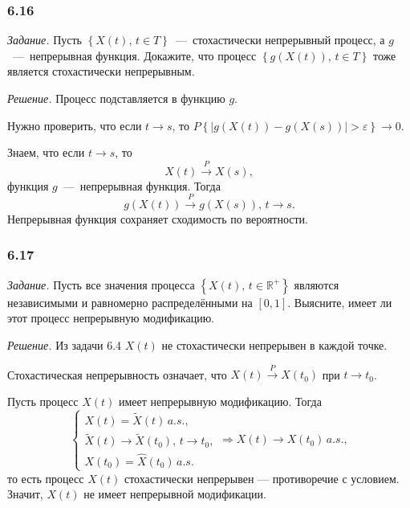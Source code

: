 \subsubsection*{6.16}

\textit{Задание.}
Пусть $ \left\{ X \left( t \right), \, t \in T \right\} $~---~стохастически непрерывный процесс,
а $g$~---~непрерывная функция.
Докажите, что процесс $ \left\{ g \left( X \left( t \right) \right), \, t \in T \right\} $
тоже является стохастически непрерывным.

\textit{Решение.}
Процесс подставляется в функцию $g$.

Нужно проверить, что если $t \to s$, то
$P \left\{
    \left| g \left( X \left( t \right) \right) - g \left( X \left( s \right) \right) \right| >
    \varepsilon \right\}
  \to 0$.

Знаем, что если $t \to s$, то
\begin{equation*}
  X \left( t \right) \overset{P}{ \to }
  X \left( s \right),
\end{equation*}
функция $g$~---~непрерывная функция.
Тогда
\begin{equation*}
  g \left( X \left( t \right) \right) \overset{P}{ \to } g \left( X \left( s \right) \right), \,
  t \to s.
\end{equation*}
Непрерывная функция сохраняет сходимость по вероятности.

\subsubsection*{6.17}

\textit{Задание.}
Пусть все значения процесса $ \left\{ X \left( t \right), \, t \in \mathbb{R}^+ \right\} $
являются независимыми и равномерно распределёнными на $ \left[ 0, 1 \right] $.
Выясните, имеет ли этот процесс непрерывную модификацию.

\textit{Решение.}
Из задачи 6.4 $X \left( t \right) $ не стохастически непрерывен в каждой точке.

Стохастическая непрерывность означает,
что $X \left( t \right) \overset{P}{ \to } X \left( t_0 \right) $ при $t \to t_0$.

Пусть процесс $X \left( t \right) $ имеет непрерывную модификацию.
Тогда
$$ \begin{cases}
    X \left( t \right) = \tilde{X} \left( t \right) \, a.s., \\
    \tilde{X} \left( t \right) \to \tilde{X} \left( t_0 \right), \, t \to t_0, \\
    X \left( t_0 \right) = \hat{X} \left( t_0 \right) \, a.s.
  \end{cases} \Rightarrow X \left( t \right) \to X \left( t_0 \right) \, a.s.,$$
то есть процесс $X \left( t \right) $ стохастически непрерывен --- противоречие с условием.
Значит, $X \left( t \right) $ не имеет непрерывной модификации.

